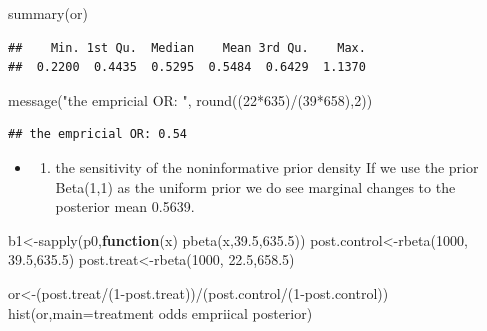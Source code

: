 \documentclass[
]{book}
\newenvironment{Shaded}{\begin{snugshade}}{\end{snugshade}}
\newcommand{\AttributeTok}[1]{\textcolor[rgb]{0.77,0.63,0.00}{#1}}
\newcommand{\ControlFlowTok}[1]{\textcolor[rgb]{0.13,0.29,0.53}{\textbf{#1}}}
\newcommand{\DecValTok}[1]{\textcolor[rgb]{0.00,0.00,0.81}{#1}}
\newcommand{\FloatTok}[1]{\textcolor[rgb]{0.00,0.00,0.81}{#1}}
\newcommand{\FunctionTok}[1]{\textcolor[rgb]{0.00,0.00,0.00}{#1}}
\newcommand{\NormalTok}[1]{#1}
\newcommand{\OtherTok}[1]{\textcolor[rgb]{0.56,0.35,0.01}{#1}}
\newcommand{\SpecialCharTok}[1]{\textcolor[rgb]{0.00,0.00,0.00}{#1}}
\newcommand{\StringTok}[1]{\textcolor[rgb]{0.31,0.60,0.02}{#1}}
\providecommand{\tightlist}{%
  \setlength{\itemsep}{0pt}\setlength{\parskip}{0pt}}
\theoremstyle{definition}
\theoremstyle{definition}
\theoremstyle{definition}
\theoremstyle{definition}
\theoremstyle{remark}
\begin{document}
\begin{Shaded}
\begin{Highlighting}[]
  \FunctionTok{summary}\NormalTok{(or)}
\end{Highlighting}
\end{Shaded}

\begin{verbatim}
##    Min. 1st Qu.  Median    Mean 3rd Qu.    Max. 
##  0.2200  0.4435  0.5295  0.5484  0.6429  1.1370
\end{verbatim}

\begin{Shaded}
\begin{Highlighting}[]
  \FunctionTok{message}\NormalTok{(}\StringTok{"the empricial OR: "}\NormalTok{, }\FunctionTok{round}\NormalTok{((}\DecValTok{22}\SpecialCharTok{*}\DecValTok{635}\NormalTok{)}\SpecialCharTok{/}\NormalTok{(}\DecValTok{39}\SpecialCharTok{*}\DecValTok{658}\NormalTok{),}\DecValTok{2}\NormalTok{))}
\end{Highlighting}
\end{Shaded}

\begin{verbatim}
## the empricial OR: 0.54
\end{verbatim}

\begin{itemize}
\item
  \begin{enumerate}
  \def\labelenumi{(\alph{enumi})}
  \setcounter{enumi}{2}
  \tightlist
  \item
    the sensitivity of the noninformative prior density
    If we use the prior Beta(1,1) as the uniform prior we do see marginal changes to the posterior mean 0.5639.
  \end{enumerate}
\end{itemize}

\begin{Shaded}
\begin{Highlighting}[]
\NormalTok{b1}\OtherTok{\textless{}{-}}\FunctionTok{sapply}\NormalTok{(p0,}\ControlFlowTok{function}\NormalTok{(x) }\FunctionTok{pbeta}\NormalTok{(x,}\FloatTok{39.5}\NormalTok{,}\FloatTok{635.5}\NormalTok{))}
\NormalTok{ post.control}\OtherTok{\textless{}{-}}\FunctionTok{rbeta}\NormalTok{(}\DecValTok{1000}\NormalTok{, }\FloatTok{39.5}\NormalTok{,}\FloatTok{635.5}\NormalTok{)}
\NormalTok{  post.treat}\OtherTok{\textless{}{-}}\FunctionTok{rbeta}\NormalTok{(}\DecValTok{1000}\NormalTok{, }\FloatTok{22.5}\NormalTok{,}\FloatTok{658.5}\NormalTok{)}

\NormalTok{  or}\OtherTok{\textless{}{-}}\NormalTok{(post.treat}\SpecialCharTok{/}\NormalTok{(}\DecValTok{1}\SpecialCharTok{{-}}\NormalTok{post.treat))}\SpecialCharTok{/}\NormalTok{(post.control}\SpecialCharTok{/}\NormalTok{(}\DecValTok{1}\SpecialCharTok{{-}}\NormalTok{post.control))}
  \FunctionTok{hist}\NormalTok{(or,}\AttributeTok{main=}\StringTok{\textquotesingle{}treatment odds empriical posterior\textquotesingle{}}\NormalTok{)}
\end{Highlighting}
\end{Shaded}
\end{document}
